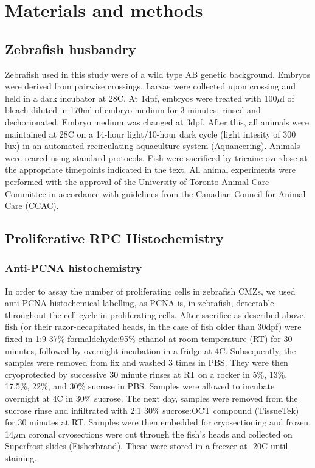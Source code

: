 \documentclass[10pt,letterpaper]{article}
\begin{document}
\section*{Materials and methods}
\subsection*{Zebrafish husbandry}
Zebrafish used in this study were of a wild type AB genetic background. Embryos were derived from pairwise crossings. Larvae were collected upon crossing and held in a dark incubator at 28\textdegree C. At 1dpf, embryos were treated with 100$\mu$l of bleach diluted in 170ml of embryo medium for 3 minutes, rinsed and dechorionated. Embryo medium was changed at 3dpf. After this, all animals were maintained at 28\textdegree C on a 14-hour light/10-hour dark cycle (light intesity of 300 lux) in an automated recirculating aquaculture system (Aquaneering). Animals were reared using standard protocols\cite{Westerfield2000}. Fish were sacrificed by tricaine overdose at the appropriate timepoints indicated in the text. All animal experiments were performed with the approval of the University of Toronto Animal Care Committee in accordance with guidelines from the Canadian Council for Animal Care (CCAC).
 
\subsection*{Proliferative RPC Histochemistry}
\subsubsection*{Anti-PCNA histochemistry}
In order to assay the number of proliferating cells in zebrafish CMZs, we used anti-PCNA histochemical labelling, as PCNA is, in zebrafish, detectable throughout the cell cycle in proliferating cells. After sacrifice as described above, fish (or their razor-decapitated heads, in the case of fish older than 30dpf) were fixed in 1:9 37\% formaldehyde:95\% ethanol at room temperature (RT) for 30 minutes, followed by overnight incubation in a fridge at 4\textdegree C. Subsequently, the samples were removed from fix and washed 3 times in PBS. They were then cryoprotected by successive 30 minute rinses at RT on a rocker in 5\%, 13\%, 17.5\%, 22\%, and 30\% sucrose in PBS. Samples were allowed to incubate overnight at 4\textdegree C in 30\% sucrose. The next day, samples were removed from the sucrose rinse and infiltrated with 2:1 30\% sucrose:OCT compound (TissueTek) for 30 minutes at RT. Samples were then embedded for cryosectioning and frozen. 14$\mu$m coronal cryosections were cut through the fish's heads and collected on Superfrost slides (Fisherbrand). These were stored in a freezer at -20\textdegree C until staining.
\end{document}
